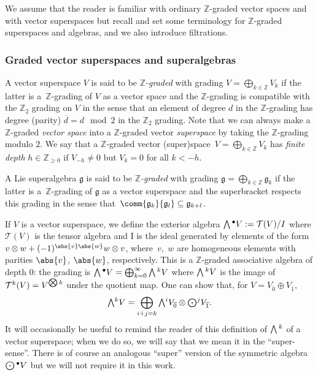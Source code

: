 \documentclass[10pt,a4paper]{amsart}
\numberwithin{equation}{section}
\newcommand{\fg}{\mathfrak{g}}
\newcommand{\ZZ}{\mathbb{Z}}
\newcommand{\Wedge}{\mathchoice{{\textstyle\bigwedge}}{\bigwedge}{\bigwedge}{\bigwedge}}	%
\newcommand{\Odot}{\mathchoice{{\textstyle\bigodot}}{\bigodot}{\bigodot}{\bigodot}}
\newcommand{\Otimes}{\mathchoice{{\textstyle\bigotimes}}{\bigotimes}{\bigotimes}{\bigotimes}}
\newcommand{\1}{\mathbbm{1}}
\begin{document}
We assume that the reader is familiar with ordinary $\ZZ$-graded vector spaces and with vector superspaces but recall and set some terminology for $\ZZ$-graded superspaces and algebras, and we also introduce filtrations.

\subsubsection{Graded vector superspaces and superalgebras}
\label{sec:graded-superalg}

A vector superspace $V$ is said to be \emph{$\ZZ$-graded} with grading $V=\bigoplus_{k\in\ZZ}V_k$ if the latter is a~$\ZZ$-grading of $V$ as a vector space and the $\ZZ$-grading is compatible with the $\ZZ_2$ grading on $V$ in the sense that an element of degree $d$ in the $\ZZ$-grading has degree (parity) $\overline{d}=d\mod 2$ in the $\ZZ_2$ grading. Note that we can always make a $\ZZ$-graded \emph{vector space} into a $\ZZ$-graded vector \emph{superspace} by taking the $\ZZ$-grading modulo $2$. We say that a $\ZZ$-graded vector (super)space~${V=\bigoplus_{k\in\ZZ}V_k}$ has \emph{finite depth} $h\in\ZZ_{\geq 0}$ if $V_{-h}\neq 0$ but $V_k=0$ for all $k<-h$.

A Lie superalgebra $\fg$ is said to be \emph{$\ZZ$-graded} with grading $\fg=\bigoplus_{k\in\ZZ}\fg_k$ if the latter is a~$\ZZ$-grading of $\fg$ as a vector superspace and the superbracket respects this grading in the sense that~${\comm{\fg_k}{\fg_l}\subseteq\fg_{k+l}}$.

If $V$ is a vector superspace, we define the exterior algebra $\Wedge^\bullet V:=\mathcal{T}(V)/I$ where $\mathcal{T}(V)$ is the tensor algebra and I is the ideal generated by elements of the form $v\otimes w + (-1)^{\abs{v}\abs{w}}w\otimes v$, where~$v$,~$w$ are homogeneous elements with parities $\abs{v}$, $\abs{w}$, respectively. This is a $\ZZ$-graded associative algebra of depth 0: the grading is $\Wedge^\bullet V = \bigoplus_{k=0}^\infty \Wedge^k V$ where $\Wedge^k V$ is the image of~${\mathcal{T}^k(V)= V^{\Otimes k}}$ under the quotient map. One can show that, for $V=V_{\overline{0}}\oplus V_{\overline{1}}$,
\begin{equation}\label{eq:super-wedge}
	\Wedge^k V = \bigoplus_{i+j=k}\Wedge^i V_{\overline{0}}\otimes\Odot^j V_{\overline{1}}.
\end{equation}
It will occasionally be useful to remind the reader of this definition of $\Wedge^k$ of a vector superspace; when we do so, we will say that we mean it in the ``super-sense''. There is of course an analogous ``super'' version of the symmetric algebra $\Odot^\bullet V$ but we will not require it in this work.
\end{document}
